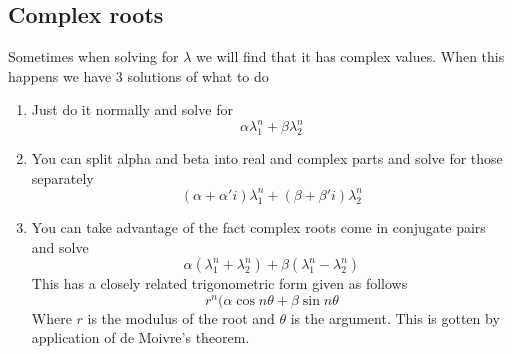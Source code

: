 \documentclass{article}
\begin{document}
\subsection{Complex roots}
Sometimes when solving for $\lambda$ we will find that it has complex values.
When this happens we have 3 solutions of what to do
\begin{enumerate}
    \item Just do it normally and solve for \[\alpha\lambda_1^n +\beta\lambda_2^n \]
    \item You can split alpha and beta into real and complex parts and solve for those separately \[(\alpha + \alpha'i)\lambda_1^n +(\beta +\beta'i)\lambda_2^n \]
    \item You can take advantage of the fact complex roots come in conjugate pairs and solve \[\alpha(\lambda_1^n + \lambda_2^n) + \beta(\lambda_1^n - \lambda_2^n)\] This has a closely related trigonometric form given as follows \[r^n(\alpha\cos n\theta + \beta \sin n \theta\]
    Where $r$ is the modulus of the root and $\theta$ is the argument. This is gotten by application of de Moivre's theorem.
\end{enumerate}
\end{document}
